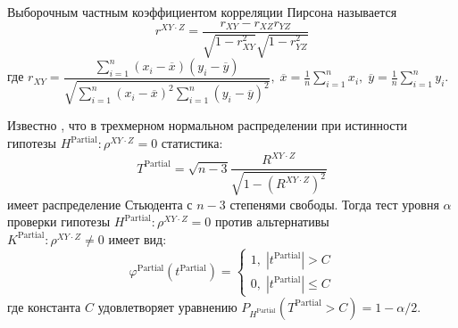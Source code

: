 \begin{definition}
    Выборочным частным коэффициентом корреляции Пирсона называется
    $$r^{XY\cdot Z}=\dfrac{r_{XY}-r_{XZ}r_{YZ}}{\sqrt{1-r_{XY}^2}\sqrt{1-r_{YZ}^2}}$$
    где 
    $r_{XY}=\dfrac{\sum_{i=1}^{n}(x_i - \overline{x})(y_i - \overline{y})}
    {\sqrt{\sum_{i=1}^{n}(x_i - \overline{x})^2
    \sum_{i=1}^{n}(y_i - \overline{y})^2}}, 
    \; \overline{x}=\frac{1}{n}\sum_{i=1}^n x_i, \;
    \overline{y}=\frac{1}{n}\sum_{i=1}^n y_i$.
\end{definition}
Известно \cite{Anderson2003}, что 
в трехмерном нормальном распределении
при истинности гипотезы $H^{\text{Partial}}: \rho^{XY \cdot Z}=0$ статистика:
$$
T^{\text{Partial}}=\sqrt{n-3} \dfrac{R^{XY \cdot Z}}{\sqrt{1-(R^{XY \cdot Z})^2}}
$$
имеет распределение Стьюдента с $n-3$ степенями свободы.
Тогда тест уровня $\alpha$ проверки гипотезы $H^{\text{Partial}}:\rho^{XY\cdot Z}=0$
против альтернативы \\ $K^{\text{Partial}}:\rho^{XY\cdot Z}\neq 0$
имеет вид:
$$
\varphi^{\text{Partial}}(t^{\text{Partial}}) = \begin{cases}
    1, \; |t^{\text{Partial}}|>C \\ 
    0, \; |t^{\text{Partial}}|\leq C
\end{cases}
$$
где константа $C$ удовлетворяет уравнению
$P_{H^{\text{Partial}}}(T^{\text{Partial}}>C)=1-\alpha/2$.
